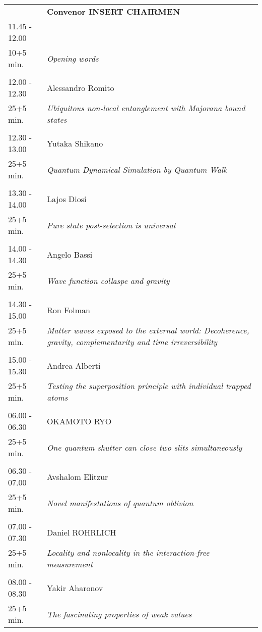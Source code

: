 \begin{longtable}{p{3cm}p{13cm}}
&\hfill {\bf Convenor INSERT CHAIRMEN }\\ 
11.45 - 12.00 & \\ 
10+5 min. & {\it Opening words}\\ 
 & \\ 
12.00 - 12.30 & Alessandro Romito\\ 
25+5 min. & {\it Ubiquitous non-local entanglement with Majorana bound states}\\ 
 & \\ 
12.30 - 13.00 & Yutaka Shikano\\ 
25+5 min. & {\it Quantum Dynamical Simulation by Quantum Walk}\\ 
 & \\ 
13.30 - 14.00 & Lajos Diosi\\ 
25+5 min. & {\it Pure state post-selection is universal}\\ 
 & \\ 
14.00 - 14.30 & Angelo Bassi\\ 
25+5 min. & {\it Wave function collaspe and gravity}\\ 
 & \\ 
14.30 - 15.00 & Ron Folman\\ 
25+5 min. & {\it Matter waves exposed to the external world: Decoherence, gravity, complementarity and time irreversibility}\\ 
 & \\ 
15.00 - 15.30 & Andrea Alberti\\ 
25+5 min. & {\it Testing the superposition principle with individual trapped atoms}\\ 
 & \\ 
06.00 - 06.30 & OKAMOTO RYO\\ 
25+5 min. & {\it One quantum shutter can close two slits simultaneously}\\ 
 & \\ 
06.30 - 07.00 & Avshalom Elitzur\\ 
25+5 min. & {\it Novel   manifestations	of  quantum oblivion}\\ 
 & \\ 
07.00 - 07.30 & Daniel ROHRLICH\\ 
25+5 min. & {\it Locality and nonlocality in the interaction-free measurement}\\ 
 & \\ 
08.00 - 08.30 & Yakir Aharonov\\ 
25+5 min. & {\it The	fascinating  properties of	weak values}\\ 

\end{longtable}

